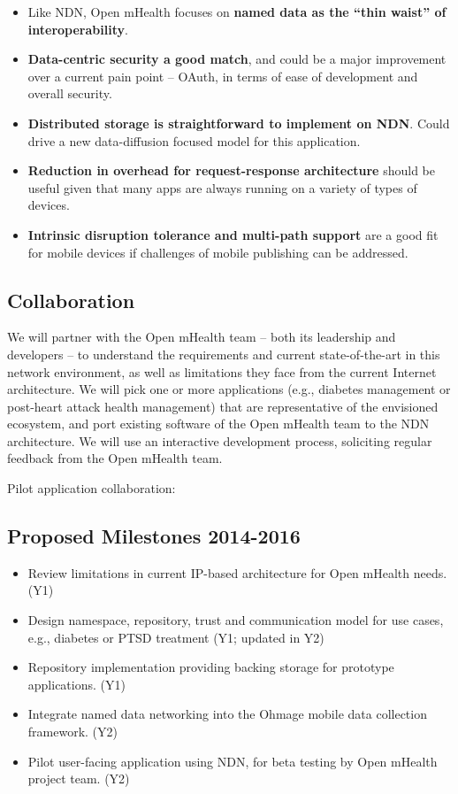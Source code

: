 \begin{itemize}
\item Like NDN, Open mHealth  focuses on \textbf{named data as the ``thin waist'' of interoperability}. 
\item \textbf{Data-centric security a good match}, and could be a major improvement over a current pain point – OAuth, in terms of ease of development and overall security.
\item \textbf{Distributed storage is straightforward to implement on NDN}. Could drive a new data-diffusion focused model for this application. 
\item \textbf{Reduction in overhead for request-response architecture} should be useful given that many apps are always running on a variety of types of devices. 
\item \textbf{Intrinsic disruption tolerance and multi-path support} are a good fit for mobile devices if challenges of mobile publishing can be addressed. 
\end{itemize}

\subsection{Collaboration}

We will partner with the Open mHealth team -- both its leadership and
developers -- to understand the requirements and current state-of-the-art
in this network environment, as well as limitations they face from the
current Internet architecture. We will pick one or more 
applications (e.g., diabetes management or post-heart attack health management) 
that are representative of the envisioned ecosystem, and port existing software
of the Open mHealth team to the NDN architecture.  We will use an interactive
development process, soliciting regular feedback from the Open mHealth team.   

Pilot application collaboration:




\subsection{Proposed Milestones 2014-2016}

\begin{itemize}
\item Review limitations in current IP-based architecture for Open mHealth needs. (Y1)
\item Design namespace, repository, trust and communication model for use cases, e.g., diabetes or PTSD treatment (Y1; updated in Y2)
\item Repository implementation providing backing storage for prototype applications. (Y1)
\item Integrate named data networking into the Ohmage mobile data collection framework. (Y2)
\item Pilot user-facing application using NDN, for beta testing by Open mHealth project team. (Y2)
\end{itemize}






